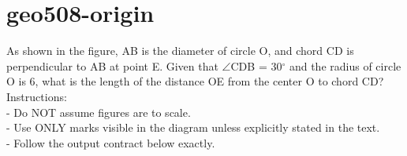 \documentclass[12pt]{article}
\begin{document}
\section*{geo508-origin}
\noindent\begin{minipage}{\textwidth}
\setlength{\parskip}{4pt}
As shown in the figure, AB is the diameter of circle O, and chord CD is perpendicular to AB at point E. Given that \ensuremath{\angle }CDB = 30\ensuremath{^\circ} and the radius of circle O is 6, what is the length of the distance OE from the center O to chord CD?\\
Instructions:\\
- Do NOT assume figures are to scale.\\
- Use ONLY marks visible in the diagram unless explicitly stated in the text.\\
- Follow the output contract below exactly.\\
\end{minipage}
\end{document}
